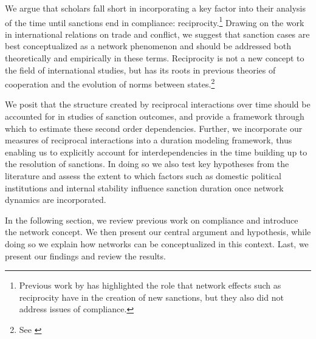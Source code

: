 We argue that scholars fall short in incorporating a key factor into their analysis of the time until sanctions end in compliance: reciprocity.\footnote{Previous work by \cite{cranmer2014reciprocity} has highlighted the role that network effects such as reciprocity have in the creation of new sanctions, but they also did not address issues of compliance.} Drawing on the work in international relations on trade and conflict, we suggest that sanction cases are best conceptualized as a network phenomenon and should be addressed both theoretically and empirically in these terms. Reciprocity is not a new concept to the field of international studies, but has its roots in previous theories of cooperation and the evolution of norms between states.\footnote{See \cite{choucri:north:1972,goldstein1991reciprocity, richardsonai:1960, ward1992reciprocity}} 

We posit that the structure created by reciprocal interactions over time should be accounted for in studies of sanction outcomes, and provide a framework through which to estimate these second order dependencies. Further, we incorporate our measures of reciprocal interactions into a duration modeling framework, thus enabling us to explicitly account for interdependencies in the time building up to the resolution of sanctions. In doing so we also test key hypotheses from the literature and assess the extent to which factors such as domestic political institutions and internal stability influence sanction duration once network dynamics are incorporated.  

In the following section, we review previous work on compliance and introduce the network concept. We then present our central argument and hypothesis, while doing so we explain how networks can be conceptualized in this context. Last, we present our findings and review the results.
